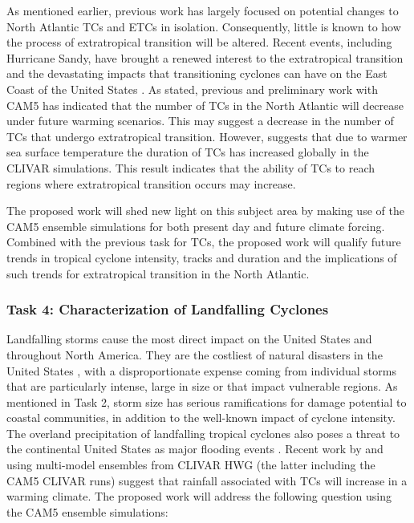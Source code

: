 \documentclass[11pt]{article}
\begin{document}
As mentioned earlier, previous work has largely focused on potential changes to North Atlantic TCs and ETCs in isolation.  Consequently, little is known to how the process of extratropical transition will be altered. Recent events, including Hurricane Sandy, have brought a renewed interest to the extratropical transition and the devastating impacts that transitioning cyclones can have on the East Coast of the United States \citep{Blake2013}. As stated, previous and preliminary work with CAM5 has indicated that the number of TCs in the North Atlantic will decrease under future warming scenarios. This may suggest a decrease in the number of TCs that undergo extratropical transition.  However, \citet{Wehner2015} suggests that due to warmer sea surface temperature the duration of TCs has increased globally in the  CLIVAR simulations.  This result indicates that the ability of TCs to reach regions where extratropical transition occurs may increase.

The proposed work will shed new light on this subject area by making use of the CAM5 ensemble simulations for both present day and future climate forcing. Combined with the previous task for TCs, the proposed work will qualify future trends in tropical cyclone intensity, tracks and duration and the implications of such trends for extratropical transition in the North Atlantic.

\subsubsection{Task 4: Characterization of Landfalling Cyclones}

Landfalling storms cause the most direct impact on the United States and throughout North America.  They are the costliest of natural disasters in the United States \citep{Pielke1998}, with a disproportionate expense coming from individual storms that are particularly intense, large in size or that impact vulnerable regions. As mentioned in Task 2, storm size has serious ramifications for damage potential to coastal communities, in addition to the well-known impact of cyclone intensity.  The overland precipitation of landfalling tropical cyclones also poses a threat to the continental United States as major flooding events \citep{Villarini2014tcflooding}. Recent work by \citet{Scoccimarro2014} and \cite{Villarini2014} using multi-model ensembles from CLIVAR HWG (the latter including the CAM5 CLIVAR runs) suggest that rainfall associated with TCs will increase in a warming climate. The proposed work will address the following question using the CAM5 ensemble simulations:
\end{document}
